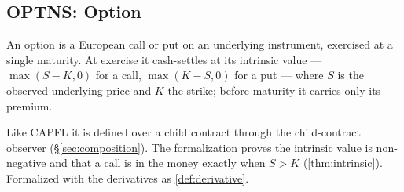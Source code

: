 \subsection{OPTNS: Option}\label{sec:optns}

An option is a European call or put on an underlying instrument, exercised at
a single maturity.  At exercise it cash-settles at its intrinsic value ---
$\max(S-K,0)$ for a call, $\max(K-S,0)$ for a put --- where $S$ is the observed
underlying price and $K$ the strike; before maturity it carries only its
premium.

Like CAPFL it is defined over a child contract through the child-contract
observer (\S\ref{sec:composition}).  The formalization proves the intrinsic
value is non-negative and that a call is in the money exactly when $S>K$
(\ref{thm:intrinsic}).  Formalized with the derivatives as \ref{def:derivative}.

